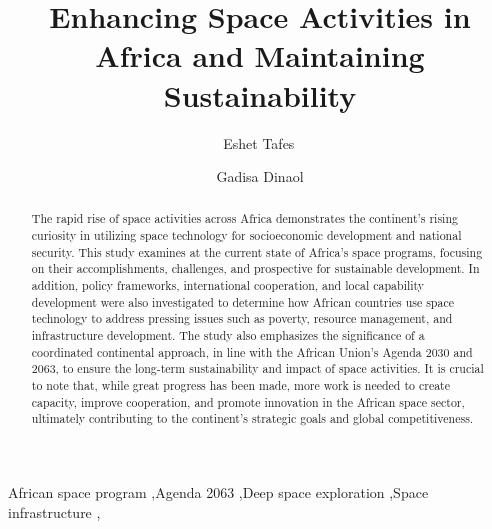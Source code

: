 \documentclass[final,5p,times, twocolumn, sort&compress, sc]{elsarticle}
\begin{document}
\begin{frontmatter}
	\title{Enhancing Space Activities in Africa and Maintaining Sustainability}
	\author[1]{Eshet Tafes\,}
	
	\author[2]{Gadisa Dinaol}





\begin{abstract}
The rapid rise of space activities across Africa demonstrates the continent's rising curiosity in utilizing space technology for socioeconomic development and national security. This study examines at the current state of Africa's space programs, focusing on their accomplishments, challenges, and prospective for sustainable development. In addition, policy frameworks, international cooperation, and local capability development were also investigated to determine how African countries use space technology to address pressing issues such as poverty, resource management, and infrastructure development. The study also emphasizes the significance of a coordinated continental approach, in line with the African Union's Agenda 2030 and 2063, to ensure the long-term sustainability and impact of space activities. It is crucial to note that, while great progress has been made, more work is needed to create capacity, improve cooperation, and promote innovation in the African space sector, ultimately contributing to the continent's strategic goals and global competitiveness.
\end{abstract}
\begin{keyword}
	African space program \sep Agenda 2063 \sep Deep space exploration \sep Space infrastructure \sep 
	
\end{keyword}
\end{frontmatter}
\end{document}
